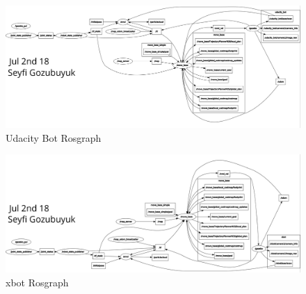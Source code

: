 \documentclass[10pt,journal,compsoc]{IEEEtran}
\begin{document}
\begin{figure}[thpb]
      \centering
      \includegraphics[width=\linewidth]{figures/rosgraph_ubot.png}
      \caption{Udacity Bot Rosgraph}
      \label{fig:ubotgrp}
\end{figure}

\begin{figure}[thpb]
      \centering
      \includegraphics[width=\linewidth]{figures/rosgraph_xbot.png}
      \caption{xbot Rosgraph}
      \label{fig:xbotgrp}
\end{figure}
\end{document}
